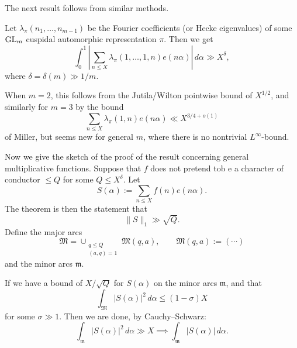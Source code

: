 \documentclass[reqno]{amsart} 
\begin{document}
The next result follows from similar methods.
\begin{theorem}
  Let $\lambda_\pi(n_1,\dotsc,n_{m-1})$ be the Fourier coefficients (or Hecke eigenvalues) of some $\operatorname{GL}_m$ cuspidal automorphic representation $\pi$.  Then we get
  \begin{equation*}
    \int_0^1
    \left\lvert \sum_{n \leq X }\lambda_\pi (1, \dotsc, 1, n ) e(n \alpha)
    \right\rvert
    \, d \alpha \gg X^\delta,
  \end{equation*}
  where $\delta = \delta(m) \gg 1/m$.
\end{theorem}
When $m = 2$, this follows from the Jutila/Wilton pointwise bound of $X^{1/2} $, and similarly for $m = 3$ by the bound
\begin{equation*}
\sum_{n \leq X} \lambda_\pi (1, n) e (n \alpha ) \ll X^{3/4 + o(1)}
\end{equation*}
of Miller, but seems new for general $m$, where there is no nontrivial $L^\infty $-bound.

Now we give the sketch of the proof of the result concerning general multiplicative functions.  Suppose that $f$ does not pretend tob e a character of conductor $\leq Q$ for some $Q \leq X^\delta$.  Let
\begin{equation*}
S (\alpha) := \sum_{n \leq X } f (n ) e (n \alpha ).
\end{equation*}
The theorem is then the statement that
\begin{equation*}
\lVert S \rVert_1 \gg \sqrt{Q}.
\end{equation*}
Define the major arcs
\begin{equation*}
  \mathfrak{M} = \cup_{
    \substack{
      q \leq Q  \\
       (a, q ) = 1
    }
  }
  \mathfrak{M} (q, a),
  \qquad
\mathfrak{M} (q, a) := (\dotsb)
\end{equation*}
and the minor arcs $\mathfrak{m}$.

If we have a bound of $X / \sqrt{Q}$ for $S(\alpha)$ on the minor arcs $\mathfrak{m}$, and that
\begin{equation*}
\int_{\mathfrak{M} } \lvert S (\alpha ) \rvert^2 \, d \alpha \leq (1 - \sigma ) X
\end{equation*}
for some $\sigma \gg 1$.  Then we are done, by Cauchy--Schwarz:
\begin{equation*}
  \int_{\mathfrak{m} } \left\lvert S (\alpha)  \right\rvert^2 \, d \alpha  \gg X \implies \int_{\mathfrak{m} }
  \left\lvert S (\alpha)  \right\rvert \, d \alpha.
\end{equation*}
\end{document}
